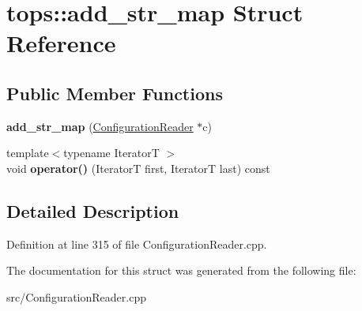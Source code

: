 \hypertarget{structtops_1_1add__str__map}{}\section{tops\+:\+:add\+\_\+str\+\_\+map Struct Reference}
\label{structtops_1_1add__str__map}
\subsection*{Public Member Functions}
\begin{DoxyCompactItemize}
\item 
\mbox{\label{structtops_1_1add__str__map_a33155f3ef82304c582e206c8c343d0a7}} 
{\bfseries add\+\_\+str\+\_\+map} (\hyperlink{classtops_1_1ConfigurationReader}{Configuration\+Reader} $\ast$c)
\item 
\mbox{\label{structtops_1_1add__str__map_a5dd72535d5949bd04f5fc262ad5ecb28}} 
{\footnotesize template$<$typename IteratorT $>$ }\\void {\bfseries operator()} (IteratorT first, IteratorT last) const
\end{DoxyCompactItemize}


\subsection{Detailed Description}


Definition at line 315 of file Configuration\+Reader.\+cpp.



The documentation for this struct was generated from the following file\+:\begin{DoxyCompactItemize}
\item 
src/Configuration\+Reader.\+cpp\end{DoxyCompactItemize}
